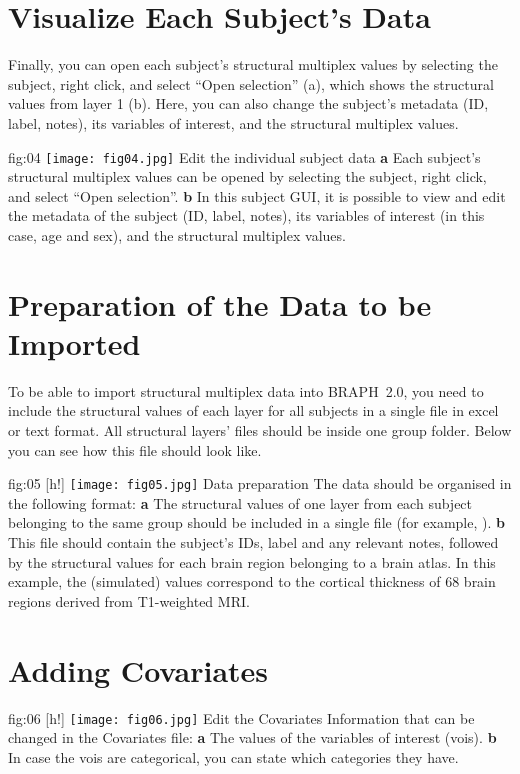 \documentclass[justified]{tufte-handout}
\begin{document}
\section{Visualize Each Subject's Data}

Finally, you can open each subject's structural multiplex values by selecting the subject, right click, and select ``Open selection'' (a), which shows the structural values from layer 1 (b). Here, you can also change the subject's metadata (ID, label, notes), its variables of interest, and the structural multiplex values.

	{fig:04}
	{\texttt{[image: fig04.jpg]}
	}
	{Edit the individual subject data}
	{
	{\bf a}  Each subject's structural multiplex values can be opened by selecting the subject, right click, and select ``Open selection''.
	{\bf b} In this subject GUI, it is possible to view and edit the metadata of the subject (ID, label, notes), its variables of interest (in this case, age and sex), and the structural multiplex values. 
	}

\clearpage
\section{Preparation of the Data to be Imported}

To be able to import structural multiplex data into BRAPH~2.0, you need to include the structural values of each layer for all subjects in a single file in excel or text format. All structural layers' files should be inside one group folder. Below you can see how this file should look like.

	{fig:05}
	{
	[h!]
	\texttt{[image: fig05.jpg]}
	}
	{Data preparation}
	{
	The data should be organised in the following format:
	{\bf a} The structural values of one layer from each subject belonging to the same group should be included in a single file (for example, ). 
	{\bf b} This file should contain the subject's IDs, label and any relevant notes, followed by the structural values for each brain region belonging to a brain atlas. In this example, the (simulated) values correspond to the cortical thickness of 68 brain regions derived from T1-weighted MRI.
	} 

\section{Adding Covariates}

	{fig:06}
	{
	[h!]
	\texttt{[image: fig06.jpg]}
	}
	{Edit the Covariates}
	{
	Information that can be changed in the Covariates file: 
	{\bf a} The values of the variables of interest (vois).
	{\bf b} In case the vois are categorical, you can state which categories they have.
	}
	
\end{document}

